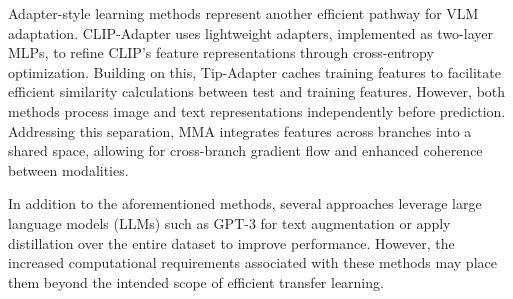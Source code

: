 Adapter-style learning methods represent another efficient pathway for VLM adaptation. CLIP-Adapter \cite{clip-adapter} uses lightweight adapters, implemented as two-layer MLPs, to refine CLIP's feature representations through cross-entropy optimization. Building on this, Tip-Adapter \cite{tip-adapter} caches training features to facilitate efficient similarity calculations between test and training features. However, both methods process image and text representations independently before prediction. Addressing this separation, MMA \cite{mma} integrates features across branches into a shared space, allowing for cross-branch gradient flow and enhanced coherence between modalities.

In addition to the aforementioned methods, several approaches \cite{coprompt, hpt, argue, promptkd} leverage large language models (LLMs) such as GPT-3 \cite{gpt3} for text augmentation or apply distillation over the entire dataset to improve performance. However, the increased computational requirements associated with these methods may place them beyond the intended scope of efficient transfer learning.